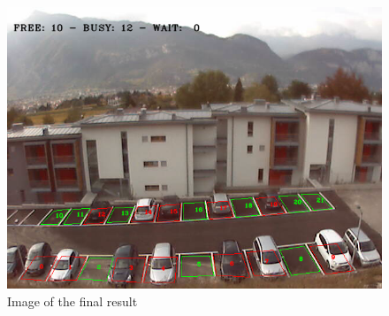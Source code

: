 	\begin{figure}[H] \label{fig:final}
	\centering
		\includegraphics[keepaspectratio, scale=0.38]{img/ICbuffer.png}
	\caption{Image of the final result}
	\end{figure}

